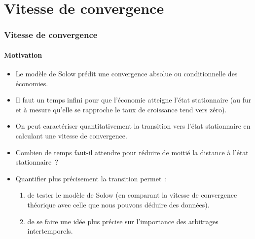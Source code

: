\documentclass[10pt,notheorems]{beamer}
\theoremstyle{plain}
\theoremstyle{definition} %
\begin{document}
\section{Vitesse de convergence}


\begin{frame}
  \frametitle{Vitesse de convergence}
  \framesubtitle{Motivation}

  \begin{itemize}

  \item Le modèle de Solow prédit une convergence absolue ou conditionnelle des économies.\newline

  \item Il faut un temps infini pour que l'économie atteigne l'état stationnaire (au fur et à mesure qu'elle se rapproche le taux de croissance tend vers zéro).\newline

  \item On peut caractériser quantitativement la transition vers l'état stationnaire en calculant une vitesse de convergence.\newline

  \item Combien de temps faut-il attendre pour réduire de moitié la distance à l'état stationnaire~?\newline

  \item Quantifier plus précisement la transition permet~:
    \begin{enumerate}
    \item de tester le modèle de Solow (en comparant la vitesse de convergence théorique avec celle que nous pouvons déduire des données).
    \item de se faire une idée plus précise sur l'importance des arbitrages intertemporels.
    \end{enumerate}

  \end{itemize}

\end{frame}
\end{document}
